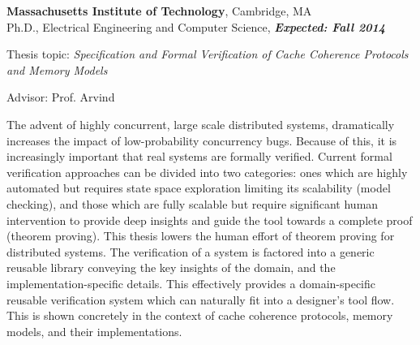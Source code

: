 \documentclass[margin,line]{resume}
\begin{document}
\begin{resume}
    \textbf{Massachusetts Institute of Technology}, Cambridge, MA \\
    \vspace{-2mm}
    Ph.D., Electrical Engineering and Computer Science, \hfill \textbf{\textit{Expected: Fall 2014}}\\
    \vspace{-2mm}
    \begin{list2}
        \item Thesis topic: \textit{Specification and Formal Verification of Cache Coherence Protocols and Memory Models}
        \item Advisor:  Prof. Arvind
				\item The advent of highly concurrent, large scale distributed systems,
dramatically increases the impact of low-probability concurrency bugs. Because
of this, it is increasingly important that real systems are formally verified.
Current formal verification approaches can be divided into two categories: ones
which are highly automated but requires state space exploration limiting its
scalability (model checking), and those which are fully scalable but require
significant human intervention to provide deep insights and guide the tool
towards a complete proof (theorem proving).
This thesis lowers the human effort of theorem proving for distributed systems.
The verification of a system is factored into a generic reusable library
conveying the key insights of the domain, and the implementation-specific details.
This effectively provides a domain-specific reusable verification system which
can naturally fit into a designer's tool flow.
This is shown concretely in the context of cache coherence protocols, memory
models, and their implementations.


\end{list2}
\end{resume}
\end{document}
